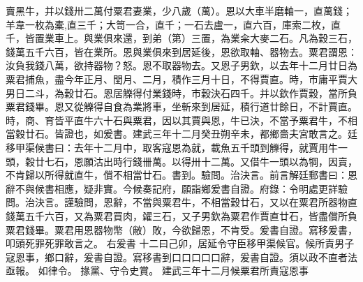 \documentclass[12pt,a4paper]{article}
\begin{document}
賣黑牛，并以錢卅二萬付粟君妻業，少八歲（萬）。恩以大車半磨軸一，直萬錢；羊韋一枚為橐,直三千；大笥一合，直千；一石去盧一，直六百，庫索二枚，直千，皆置業車上。與業俱來還，到弟（第）三置，為業籴大麥二石。凡為穀三石，錢萬五千六百，皆在業所。恩與業俱來到居延後，恩欲取軸、器物去。粟君謂恩：汝負我錢八萬，欲持器物？怒。恩不取器物去。又恩子男欽，以去年十二月廿日為粟君捕魚，盡今年正月、閏月、二月，積作三月十日，不得賈直。時，市庸平賈大男日二斗，為穀廿石。恩居觻得付業錢時，市穀決石四千。并以欽作賈穀，當所負粟君錢畢。恩又從觻得自食為業將車，坐斬來到居延，積行道廿餘日，不計賈直。時，商、育皆平直牛六十石與粟君，因以其賈與恩，牛已決，不當予粟君牛，不相當穀廿石。皆證也，如爰書。建武三年十二月癸丑朔辛未，都鄉嗇夫宮敢言之。廷移甲渠候書曰：去年十二月中，取客寇恩為就，載魚五千頭到觻得，就賈用牛一頭，穀廿七石，恩願沽出時行錢卌萬。以得卅十二萬。又借牛一頭以為犅，因賣，不肯歸以所得就直牛，償不相當廿石。書到。驗問。治決言。前言解廷郵書曰：恩辭不與候書相應，疑非實。今候奏記府，願詣鄉爰書自證。府錄：令明處更詳驗問。治決言。謹驗問，恩辭，不當與粟君牛，不相當穀廿石，又以在粟君所器物直錢萬五千六百，又為粟君買肉，糴三石，又子男欽為粟君作賈直廿石，皆盡償所負粟君錢畢。粟君用恩器物幣（敝）敗，今欲歸恩，不肯受。爰書自證。寫移爰書，叩頭死罪死罪敢言之。
右爰書
十二曰己卯，居延令守臣移甲渠候官。候所責男子寇恩事，鄉口辭，爰書自證。寫移書到口口口口口辭，爰書自證。須以政不直者法亟報。 如律令。 掾黨、守令史賞。
建武三年十二月候粟君所責寇恩事


\vspace{1em}
\end{document}
